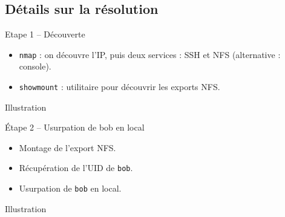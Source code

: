 \documentclass{beamer}
\begin{document}
	\subsection{Détails sur la résolution}

        \begin{frame}[fragile]
            \begin{block}{Etape 1 -- Découverte}
                \begin{itemize}
                    \item \verb+nmap+ : on découvre l'IP, puis deux services : SSH et NFS (alternative : console).
                    \item \verb+showmount+ : utilitaire pour découvrir les exports NFS.
                \end{itemize}
            \end{block}
            \begin{exampleblock}{Illustration}
                \begin{center}
                \end{center}
            \end{exampleblock}
        \end{frame}

        \begin{frame}[fragile]
            \begin{block}{Étape 2 -- Usurpation de bob en local}
                \begin{itemize}
                    \item Montage de l'export NFS.
                    \item Récupération de l'UID de \verb+bob+.
                    \item Usurpation de \verb+bob+ en local.
                \end{itemize}
            \end{block}
            \begin{exampleblock}{Illustration}
                \begin{center}
                \end{center}
            \end{exampleblock}
        \end{frame}
\end{document}
